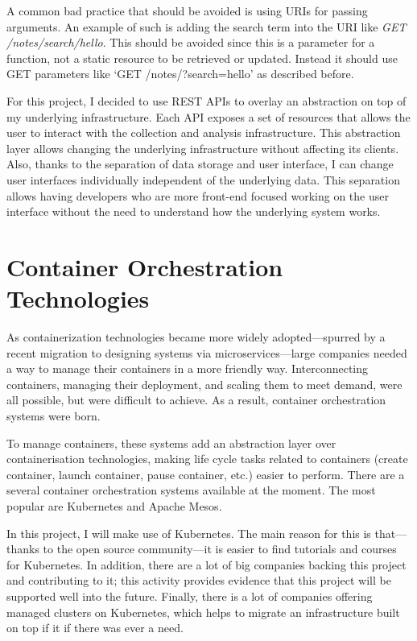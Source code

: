 A common bad practice that should be avoided is using URIs for passing arguments. An example of such is adding the search term into the URI like \textit{GET /notes/search/hello}. This should be avoided since this is a parameter for a function, not a static resource to be retrieved or updated. Instead it should use GET parameters like ‘GET /notes/?search=hello’ as described before. 

For this project, I decided to use REST APIs to overlay an abstraction on top of my underlying infrastructure. Each API exposes a set of resources that allows the user to interact with the collection and analysis infrastructure. This abstraction layer allows changing the underlying infrastructure without affecting its clients. Also, thanks to the separation of data storage and user interface, I can change user interfaces individually independent of the underlying data. This separation allows having developers who are more front-end focused working on the user interface without the need to understand how the underlying system works.

\section{Container Orchestration Technologies}

As containerization technologies became more widely adopted---spurred by a recent migration to designing systems via microservices---large companies needed a way to manage their containers in a more friendly way. Interconnecting containers, managing their deployment, and scaling them to meet demand, were all possible, but were difficult to achieve. As a result, container orchestration systems were born.

To manage containers, these systems add an abstraction layer over containerisation technologies, making life cycle tasks related to containers (create container, launch container, pause container, etc.) easier to perform. There are a several container orchestration systems available at the moment. The most popular are Kubernetes and Apache Mesos.

In this project, I will make use of Kubernetes. The main reason for this is that---thanks to the open source community---it is easier to find tutorials and courses for Kubernetes. In addition, there are a lot of big companies backing this project and contributing to it; this activity provides evidence that this project will be supported well into the future. Finally, there is a lot of companies offering managed clusters on Kubernetes, which helps to migrate an infrastructure built on top if it if there was ever a need.

